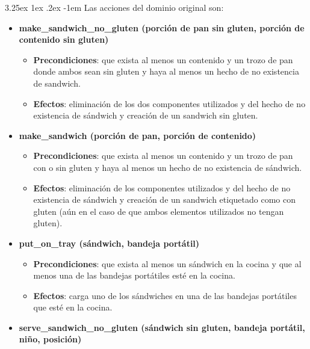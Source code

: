 \documentclass{article}
\makeatletter
\renewcommand\paragraph{\@startsection{paragraph}{5}{\z@}%
      {3.25ex \@plus1ex \@minus.2ex}%
      {-1em}%
      {\normalfont\normalsize\bfseries}}
\makeatother
\begin{document}
    \paragraph{}
    Las acciones del dominio original son:
    \begin{itemize}
        \item \textbf{make\_sandwich\_no\_gluten (porción de pan sin gluten, porción de contenido sin gluten)}
            \begin{itemize}
                \item \textbf{Precondiciones}: que exista al menos un contenido y un trozo de
                pan donde ambos sean sin gluten y haya al menos un hecho de no
                existencia de sandwich. 
                \item \textbf{Efectos}: eliminación de los dos componentes utilizados y del hecho
                de no existencia de sándwich y creación de un sandwich sin gluten.
            \end{itemize}
        \item \textbf{make\_sandwich (porción de pan, porción de contenido)}
            \begin{itemize}
                \item \textbf{Precondiciones}: que exista al menos un contenido y un trozo de
                pan con o sin gluten y haya al menos un hecho de no existencia de
                sándwich.
                \item \textbf{Efectos}: eliminación de los componentes utilizados y del hecho de no
                existencia de sándwich y creación de un sandwich etiquetado como
                con gluten (aún en el caso de que ambos elementos utilizados no
                tengan gluten).
            \end{itemize}
        \item \textbf{put\_on\_tray (sándwich, bandeja portátil)}
            \begin{itemize}
                \item \textbf{Precondiciones}: que exista al menos un sándwich en la cocina y
                que al menos una de las bandejas portátiles esté en la cocina.
                \item \textbf{Efectos}: carga uno de los sándwiches en una de las bandejas
                portátiles que esté en la cocina.
            \end{itemize}
        \item \textbf{serve\_sandwich\_no\_gluten (sándwich sin gluten, bandeja portátil, niño, posición)}

\end{itemize}
\end{document}
